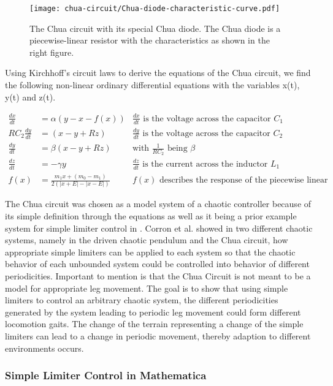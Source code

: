 \documentclass[main]{subfiles}
\begin{document}
\begin{figure}[H]
\centering

\texttt{[image: chua-circuit/Chua-diode-characteristic-curve.pdf]}
\caption[The Chua circuit]{The Chua circuit with its special Chua diode. The Chua diode is a piecewise-linear resistor with the characteristics as shown in the right figure.}
\label{figure:chuacircuit}
\end{figure}

Using Kirchhoff's circuit laws to derive the equations of the Chua circuit, we find the following non-linear ordinary differential equations with the variables x(t), y(t) and z(t).

\begin{align*}
\frac{dx}{dt}&=\alpha (y-x-f(x)) &\frac{dx}{dt}\text{ is the voltage across the capacitor }C_1\\
RC_2\frac{dy}{dt}&= (x-y+Rz) &\frac{dy}{dt}\text{ is the voltage across the capacitor }C_2\\
\frac{dy}{dt}&=\beta (x-y+Rz) &\text{with } \frac{1}{RC_2} \text{ being }\beta\\
\frac{dz}{dt}&=-\gamma y &\frac{dz}{dt}\text{ is the current across the inductor }L_1\\
f (x) &= \frac{m_1 x + (m_0 - m_1)}{2 (| x + E | -| x - E |)} &f(x)\text{ describes the response of the piecewise linear resistor}
\end{align*}

The Chua circuit was chosen as a model system of a chaotic controller because of its simple definition through the equations as well as it being a prior example system for simple limiter control in \cite{bib:Corron2000}. %
%
Corron et al. showed in two different chaotic systems, namely in the driven chaotic pendulum and the Chua circuit, how appropriate simple limiters can be applied to each system so that the chaotic behavior of each unbounded system could be controlled into behavior of different periodicities. %
%
Important to mention is that the Chua Circuit is not meant to be a model for appropriate leg movement. %
%
The goal is to show that using simple limiters to control an arbitrary chaotic system, the different periodicities generated by the system leading to periodic leg movement could form different locomotion gaits. %
%
The change of the terrain representing a change of the simple limiters can lead to a change in periodic movement, thereby adaption to different environments occurs. 

\subsubsection{Simple Limiter Control in Mathematica}
\label{subsubsec:simple-limiter-mathematica}
\end{document}
